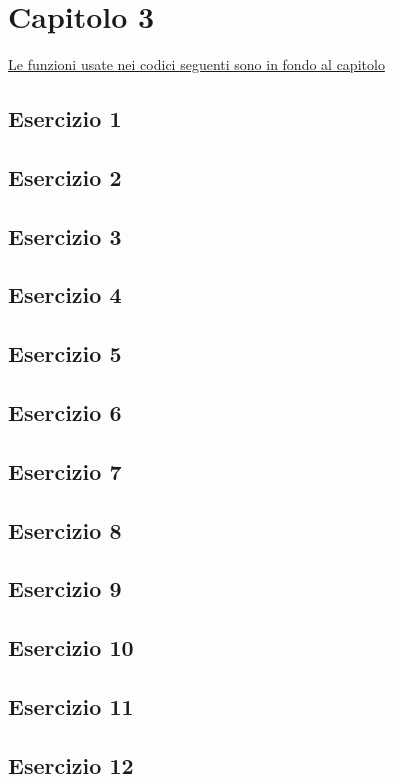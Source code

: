 \section{Capitolo 3}
\underline{Le funzioni usate nei codici seguenti sono in fondo al capitolo}
\subsection{Esercizio 1}

\subsection{Esercizio 2}

\subsection{Esercizio 3}

\subsection{Esercizio 4}

\subsection{Esercizio 5}

\subsection{Esercizio 6}

\subsection{Esercizio 7}

\subsection{Esercizio 8}

\subsection{Esercizio 9}

\subsection{Esercizio 10}

\subsection{Esercizio 11}

\subsection{Esercizio 12}

